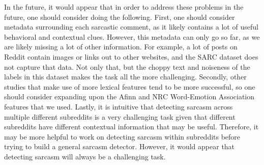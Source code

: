 \documentclass{article}
\begin{document}
In the future, it would appear that in order to address these problems in the future, one should consider doing the following. First, one should consider metadata surrounding each sarcastic comment, as it likely contains a lot of useful behavioral and contextual clues. However, this metadata can only go so far, as we are likely missing a lot of other information. For example, a lot of posts on Reddit contain images or links out to other websites, and the SARC dataset does not capture that data. Not only that, but the choppy text and noiseness of the labels in this dataset makes the task all the more challenging. Secondly, other studies that make use of more lexical features \citep{riloff2013sarcasm, hiray2017agree} tend to be more successful, so one should consider expanding upon the Afinn and NRC Word-Emotion Association features that we used. Lastly, it is intuitive that detecting sarcasm across multiple different subreddits is a very challenging task given that different subreddits have different contextual information that may be useful. Therefore, it may be more helpful to work on detecting sarcasm within subreddits before trying to build a general sarcasm detector. However, it would appear that detecting sarcasm will always be a challenging task. 



\end{document}
